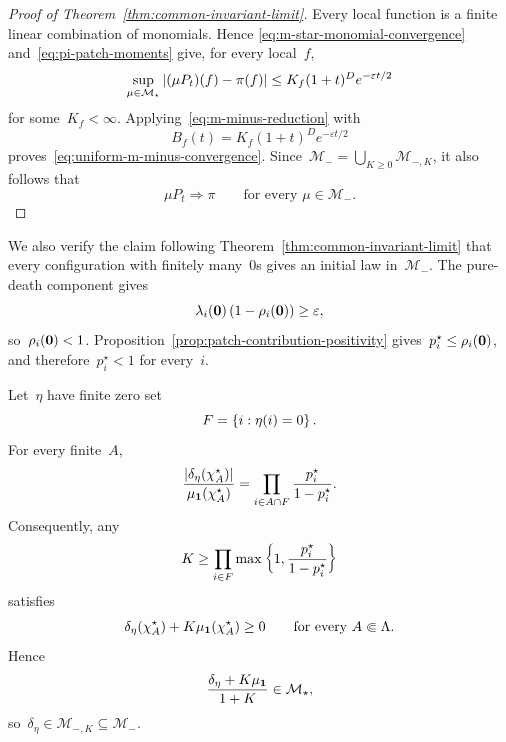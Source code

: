 \documentclass[EJP,preprint,NODS,nobera]{ejpecp}
\begin{document}
\begin{proof}[Proof of Theorem~\ref{thm:common-invariant-limit}]
Every local function is a finite linear combination of monomials. Hence
\eqref{eq:m-star-monomial-convergence} and~\eqref{eq:pi-patch-moments} give,
for every local~$f$,
\begin{equation}
\label{eq:m-star-local-convergence}
\sup_{\mu\in\mathcal M_\star}
\left|(\mu P_t)(f)-\pi(f)\right|
\leq
K_f(1+t)^D e^{-\varepsilon t/2}
\end{equation}
for some~$K_f<\infty$. Applying~\eqref{eq:m-minus-reduction} with
\begin{equation*}
B_f(t)
=
K_f(1+t)^D e^{-\varepsilon t/2}
\end{equation*}
proves~\eqref{eq:uniform-m-minus-convergence}. Since~$\mathcal M_- = \bigcup_{K\geq0}\mathcal M_{-,K}$, it also follows that
\begin{equation*}
\mu P_t\Rightarrow\pi
\qquad
\text{for every }\mu\in\mathcal M_-.
\end{equation*}
\end{proof}

We also verify the claim following Theorem~\ref{thm:common-invariant-limit}
that every configuration with finitely many~$0$s gives an initial law in~$\mathcal M_-$. The pure-death component gives
\begin{equation*}
\lambda_i(\mathbf{0})\left(1-\rho_i(\mathbf{0})\right)
\geq
\varepsilon,
\end{equation*}
so~$\rho_i(\mathbf{0})<1$. Proposition~\ref{prop:patch-contribution-positivity}
gives~$p_i^\star\leq\rho_i(\mathbf{0})$, and therefore~$p_i^\star<1$ for every~$i$.

Let~$\eta$ have finite zero set
\begin{equation*}
F
=
\left\{i:\eta(i)=0\right\}.
\end{equation*}
For every finite~$A$,
\begin{equation*}
\frac{
\left|\delta_\eta(\chi_A^\star)\right|
}{
\mu_{\mathbf{1}}(\chi_A^\star)
}
=
\prod_{i\in A\cap F}
\frac{p_i^\star}{1-p_i^\star}.
\end{equation*}
Consequently, any
\begin{equation*}
K
\geq
\prod_{i\in F}
\max\left\{
1,
\frac{p_i^\star}{1-p_i^\star}
\right\}
\end{equation*}
satisfies
\begin{equation*}
\delta_\eta(\chi_A^\star)
+
K\mu_{\mathbf{1}}(\chi_A^\star)
\geq0
\qquad
\text{for every }A\Subset\Lambda.
\end{equation*}
Hence
\begin{equation*}
\frac{\delta_\eta+K\mu_{\mathbf{1}}}{1+K}
\in
\mathcal M_\star,
\end{equation*}
so~$\delta_\eta\in\mathcal M_{-,K}\subseteq\mathcal M_-$.
\end{document}
